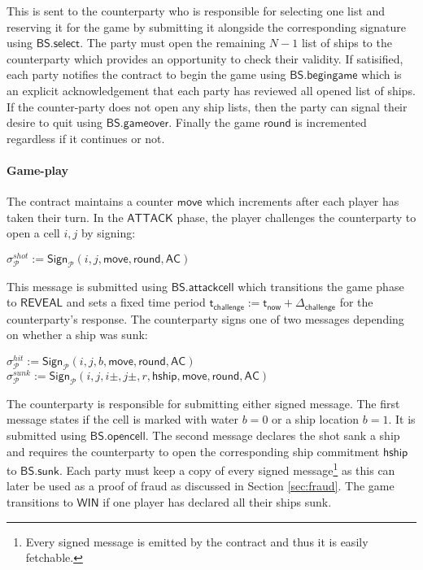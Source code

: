 \documentclass{llncs}
\newcommand{\gameattack}{\mathsf{ATTACK}}
\newcommand{\gamereveal}{\mathsf{REVEAL}}
\newcommand{\gamewinner}{\mathsf{WIN}}
\newcommand{\hship}{\mathsf{hship}}
\newcommand{\participant}{\mathcal{P}}
\newcommand{\sign}{\mathsf{Sign}}
\newcommand{\battleshipattackcell}{\mathsf{BS.attackcell}}
\newcommand{\battleshipbegin}{\mathsf{BS.begingame}}
\newcommand{\battleshipselectboard}{\mathsf{BS.select}}
\newcommand{\battleshiprevealcell}{\mathsf{BS.opencell}}
\newcommand{\battleshipsinking}{\mathsf{BS.sunk}}
\newcommand{\battleshipgameover}{\mathsf{BS.gameover}}
\newcommand{\appcontract}{\mathsf{AC}}
\newcommand{\timerchallenge}{\mathsf{\Delta}_{\mathsf{challenge}}}
\newcommand{\timechallenge}{\mathsf{t}_{\mathsf{challenge}}}
\newcommand{\timenow}{\mathsf{t}_{\mathsf{now}}}
\begin{document}
This is sent to the counterparty who is responsible for selecting one list and reserving it for the game by submitting it alongside the corresponding signature using $\battleshipselectboard$. 
The party must open the remaining $N-1$ list of ships to the counterparty which provides an opportunity to check their validity. 
If satisified, each party notifies the contract to begin the game using $\battleshipbegin$ which is an explicit acknowledgement that each party has reviewed all opened list of ships.
If the counter-party does not open any ship lists, then the party can signal their desire to quit  using $\battleshipgameover$.
Finally the game $\mathsf{round}$ is incremented regardless if it continues or not. 

\paragraph{Game-play} \label{sec:gameplayships}
The contract maintains a counter $\mathsf{move}$ which increments after each player has taken their turn. 
In the $\gameattack$ phase, the player challenges the counterparty to open a cell $i,j$ by signing: 

\begin{center}
	$\sigma^{shot}_{\participant} := \sign_{\participant}(i,j, \mathsf{move}, \mathsf{round},\appcontract)$ \\
\end{center}

This message is submitted using $\battleshipattackcell$ which transitions the game phase to $\gamereveal$ and sets a fixed time period $\timechallenge := \timenow + \timerchallenge$ for the counterparty's response. 
The counterparty signs one of two messages depending on whether a ship was sunk:

\begin{center}
	$\sigma^{hit}_{\participant} := \sign_{\participant}(i,j,b,\mathsf{move}, \mathsf{round},\appcontract)$ \\ $\sigma^{sunk}_{\participant} := \sign_{\participant}(i,j,i\pm,j\pm,r,\hship,\mathsf{move}, \mathsf{round},\appcontract)$
\end{center}

The counterparty is responsible for submitting either signed message. 
The first message states if the cell is marked with water $b=0$ or a ship location $b=1$.
It is submitted using $\battleshiprevealcell$.
The second message declares the shot sank a ship and requires the counterparty to open the corresponding ship commitment $\hship$ to $\battleshipsinking$. 
Each party must keep a copy of every signed message\footnote{Every signed message is emitted by the contract and thus it is easily fetchable.} as this can later be used as a proof of fraud as discussed in Section \ref{sec:fraud}.
The game transitions to $\gamewinner$ if one player has declared all their ships sunk. 
\end{document}
